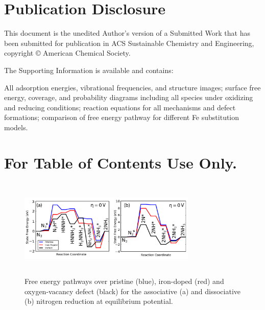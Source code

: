 \documentclass[journal=ascecg,manuscript=article,articletitle=true]{achemso}
\begin{document}
\section{Publication Disclosure}
This document is the unedited Author's version of a Submitted Work that has been submitted for publication in ACS Sustainable Chemistry and Engineering, copyright © American Chemical Society.


\begin{suppinfo}
The Supporting Information is available and contains:

All adsorption energies, vibrational frequencies, and structure images; surface free energy, coverage, and probability diagrams including all species under oxidizing and reducing conditions; reaction equations for all mechanisms and defect formations; comparison of free energy pathway for different Fe substitution models.

\end{suppinfo}

\newpage
\section{For Table of Contents Use Only.}
\begin{figure}

\includegraphics[width=8.47cm,height=4.76cm,]{figures/defect_effects.pdf}
\caption{Free energy pathways over pristine (blue), iron-doped (red) and oxygen-vacancy defect (black) for the associative (a) and dissociative (b) nitrogen reduction at equilibrium potential.}
\label{fig:defect_effects}
\end{figure}
\end{document}
